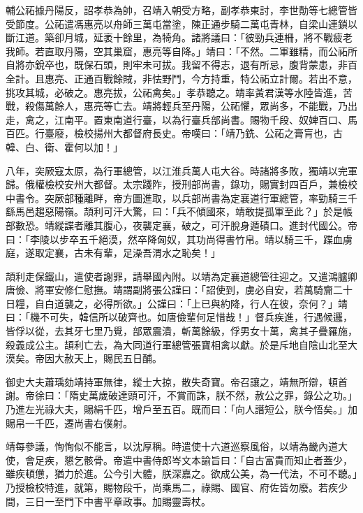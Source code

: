 \begin{pinyinscope}
 輔公祏據丹陽反，詔孝恭為帥，召靖入朝受方略，副孝恭東討，李世勣等七總管皆受節度。公祏遣馮惠亮以舟師三萬屯當塗，陳正通步騎二萬屯青林，自梁山連鎖以斷江道。築卻月城，延袤十餘里，為犄角。諸將議曰：「彼勁兵連柵，將不戰疲老我師。若直取丹陽，空其巢窟，惠亮等自降。」靖曰：「不然。二軍雖精，而公祏所自將亦銳卒也，既保石頭，則牢未可拔。我留不得志，退有所忌，腹背蒙患，非百全計。且惠亮、正通百戰餘賊，非怯野鬥，今方持重，特公祏立計爾。若出不意，挑攻其城，必破之。惠亮拔，公祏禽矣。」孝恭聽之。靖率黃君漢等水陸皆進，苦戰，殺傷萬餘人，惠亮等亡去。靖將輕兵至丹陽，公祏懼，眾尚多，不能戰，乃出走，禽之，江南平。置東南道行臺，以為行臺兵部尚書。賜物千段、奴婢百口、馬百匹。行臺廢，檢校揚州大都督府長史。帝嘆曰：「靖乃銑、公祏之膏肓也，古韓、白、衛、霍何以加！」



 八年，突厥寇太原，為行軍總管，以江淮兵萬人屯大谷。時諸將多敗，獨靖以完軍歸。俄權檢校安州大都督。太宗踐阼，授刑部尚書，錄功，賜實封四百戶，兼檢校中書令。突厥部種離畔，帝方圖進取，以兵部尚書為定襄道行軍總管，率勁騎三千繇馬邑趨惡陽嶺。頡利可汗大驚，曰：「兵不傾國來，靖敢提孤軍至此？」於是帳部數恐。靖縱諜者離其腹心，夜襲定襄，破之，可汗脫身遁磧口。進封代國公。帝曰：「李陵以步卒五千絕漠，然卒降匈奴，其功尚得書竹帛。靖以騎三千，蹀血虜庭，遂取定襄，古未有輩，足澡吾渭水之恥矣！」



 頡利走保鐵山，遣使者謝罪，請舉國內附。以靖為定襄道總管往迎之。又遣鴻臚卿唐儉、將軍安修仁慰撫。靖謂副將張公謹曰：「詔使到，虜必自安，若萬騎齎二十日糧，自白道襲之，必得所欲。」公謹曰：「上已與約降，行人在彼，奈何？」靖曰：「機不可失，韓信所以破齊也。如唐儉輩何足惜哉！」督兵疾進，行遇候邏，皆俘以從，去其牙七里乃覺，部眾震潰，斬萬餘級，俘男女十萬，禽其子疊羅施，殺義成公主。頡利亡去，為大同道行軍總管張寶相禽以獻。於是斥地自陰山北至大漠矣。帝因大赦天上，賜民五日酺。



 御史大夫蕭瑀劾靖持軍無律，縱士大掠，散失奇寶。帝召讓之，靖無所辯，頓首謝。帝徐曰：「隋史萬歲破達頭可汗，不賞而誅，朕不然，赦公之罪，錄公之功。」乃進左光祿大夫，賜絹千匹，增戶至五百。既而曰：「向人譖短公，朕今悟矣。」加賜帛一千匹，遷尚書右僕射。



 靖每參議，恂恂似不能言，以沈厚稱。時遣使十六道巡察風俗，以靖為畿內道大使，會足疾，懇乞骸骨。帝遣中書侍郎岑文本諭旨曰：「自古富貴而知止者蓋少，雖疾頓憊，猶力於進。公今引大體，朕深嘉之。欲成公美，為一代法，不可不聽。」乃授檢校特進，就第，賜物段千，尚乘馬二，祿賜、國官、府佐皆勿廢。若疾少間，三日一至門下中書平章政事。加賜靈壽杖。




\end{pinyinscope}
